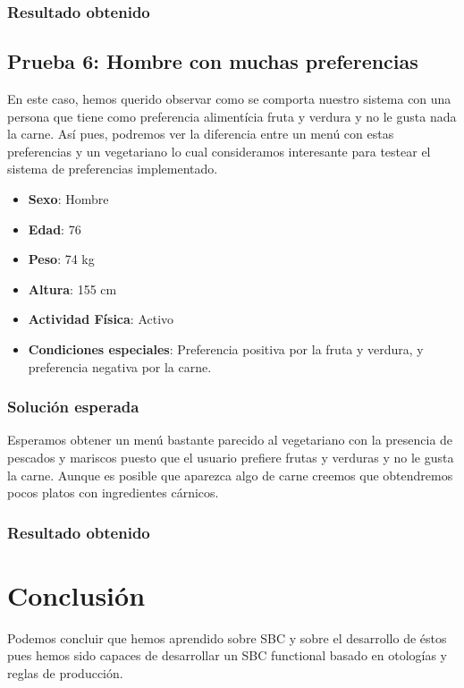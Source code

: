 \documentclass[11]{article}
\begin{document}
\subsubsection{Resultado obtenido}

\subsection{Prueba 6: Hombre con muchas preferencias}
En este caso, hemos querido observar como se comporta nuestro sistema con una persona que tiene como preferencia alimentícia fruta y verdura y no le gusta nada la carne. Así pues, podremos ver la diferencia entre un menú con estas preferencias y un vegetariano lo cual consideramos interesante para testear el sistema de preferencias implementado. 

\begin{itemize}
\item \textbf{Sexo}: Hombre
\item \textbf{Edad}: 76
\item \textbf{Peso}: 74 kg
\item \textbf{Altura}: 155 cm
\item \textbf{Actividad Física}: Activo
\item \textbf{Condiciones especiales}: Preferencia positiva por la fruta y verdura, y preferencia negativa por la carne.
\end{itemize}
\subsubsection{Solución esperada}
Esperamos obtener un menú bastante parecido al vegetariano con la presencia de pescados y mariscos puesto que el usuario prefiere frutas y verduras y no le gusta la carne. Aunque es posible que aparezca algo de carne creemos que obtendremos pocos platos con ingredientes cárnicos. 

\subsubsection{Resultado obtenido}

\section{Conclusión}
Podemos concluir que hemos aprendido sobre SBC y sobre el desarrollo de éstos pues hemos sido capaces de desarrollar un SBC functional basado en otologías y reglas de producción.
\end{document}
